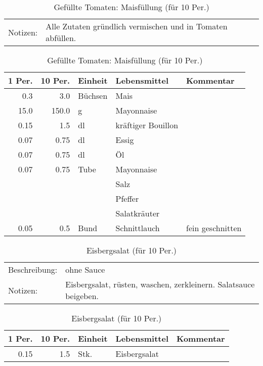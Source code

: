 \documentclass[11pt,a4paper]{article}%
\begin{document}
\begin{table}[h]%
\caption{Gefüllte Tomaten: Maisfüllung (für 10 Per.)}%
\begin{tabularx}{\textwidth}{l X}%
Notizen:&Alle Zutaten gründlich vermischen und in Tomaten abfüllen.\newline%
\\%
\end{tabularx}%
\par%
\begin{tabularx}{\textwidth}{| r | r | l | l | X |}%
\hline%
\tiny{1 Per.}&\tiny{10 Per.}&\tiny{Einheit}&\tiny{Lebensmittel}&\tiny{Kommentar}\\%
\hline%
0.3&3.0&Büchsen&Mais&\\%
\hline%
15.0&150.0&g&Mayonnaise&\\%
\hline%
0.15&1.5&dl&kräftiger Bouillon&\\%
\hline%
0.07&0.75&dl&Essig&\\%
\hline%
0.07&0.75&dl&Öl&\\%
\hline%
0.07&0.75&Tube&Mayonnaise&\\%
\hline%
&&&Salz&\\%
\hline%
&&&Pfeffer&\\%
\hline%
&&&Salatkräuter&\\%
\hline%
0.05&0.5&Bund&Schnittlauch&fein geschnitten\\%
\hline%
\end{tabularx}%
\end{table}

%
\vspace{0.75cm}%
\renewcommand{\arraystretch}{1.25}%


\begin{table}[h]%
\caption{Eisbergsalat (für 10 Per.)}%
\begin{tabularx}{\textwidth}{l X}%
Beschreibung: &ohne Sauce\\%
Notizen:&Eisbergsalat, rüsten, waschen, zerkleinern. Salatsauce beigeben.\\%
\end{tabularx}%
\par%
\begin{tabularx}{\textwidth}{| r | r | l | l | X |}%
\hline%
\tiny{1 Per.}&\tiny{10 Per.}&\tiny{Einheit}&\tiny{Lebensmittel}&\tiny{Kommentar}\\%
\hline%
0.15&1.5&Stk.&Eisbergsalat&\\%
\hline%
\end{tabularx}%
\end{table}
\end{document}
